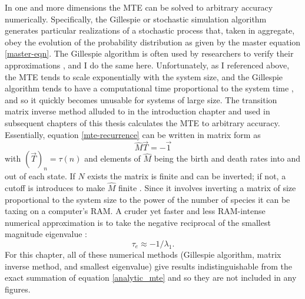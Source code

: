 In one and more dimensions the MTE can be solved to arbitrary accuracy numerically. %
Specifically, the Gillespie or stochastic simulation algorithm \cite{Gillespie1977,Cao2006} generates particular realizations of a stochastic process that, taken in aggregate, obey the evolution of the probability distribution as given by the master equation \ref{master-eqn}. %
The Gillespie algorithm is often used by researchers to verify their approximations \cite{Reichenbach2006,Black2012,Dobrinevski2012,Chotibut2015,Constable2015,Gooding-townsend2015,Young2018}, and I do the same here. %
Unfortunately, as I referenced above, the MTE tends to scale exponentially with the system size, and the Gillespie algorithm tends to have a computational time proportional to the system time \cite{Gillespie1977}, and so it quickly becomes unusable for systems of large size. %
The transition matrix inverse method alluded to in the introduction chapter and used in subsequent chapters of this thesis calculates the MTE to arbitrary accuracy. 
Essentially, equation \ref{mte-recurrence} can be written in matrix form as \cite{Nisbet1982,Iyer-Biswas2015}
\begin{equation}
\hat{M}\vec{T} = -\vec{1} \label{matrix-method}
\end{equation}
with $\left(\vec{T}\right)_n = \tau(n)$ and elements of $\hat{M}$ being the birth and death rates into and out of each state. 
If $N$ exists the matrix is finite and can be inverted; if not, a cutoff is introduces to make $\hat{M}$ finite \cite{Munsky2006,Parsons2007,Parsons2010}. 
Since it involves inverting a matrix of size proportional to the system size to the power of the number of species it can be taxing on a computer's RAM. 
A cruder yet faster and less RAM-intense numerical approximation is to take the negative reciprocal of the smallest magnitude eigenvalue \cite{Hanggi1990}:
\begin{equation}
 \tau_e \approx -1/\lambda_1. 
\end{equation}
For this chapter, all of these numerical methods (Gillespie algorithm, matrix inverse method, and smallest eigenvalue) give results indistinguishable from the exact summation of equation \ref{analytic_mte} and so they are not included in any figures. 

